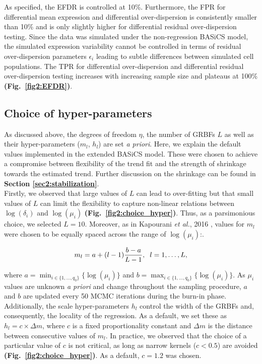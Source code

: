 As specified, the EFDR is controlled at 10\%. Furthermore, the FPR for differential mean expression and differential over-dispersion is consistently smaller than 10\% and is only slightly higher for differential residual over-dispersion testing. Since the data was simulated under the non-regression BASiCS model, the simulated expression variability cannot be controlled in terms of residual over-dispersion parameters $\epsilon_i$ leading to subtle differences between simulated cell populations. The TPR for differential over-dispersion and differential residual over-dispersion testing increases with increasing sample size and plateaus at 100\% \textbf{(Fig.~\ref{fig2:EFDR})}.

\subsection{Choice of hyper-parameters} \label{sec2:hyper-parameters}

As discussed above, the degrees of freedom $\eta$, the number of GRBFs  $L$ as well as their hyper-parameters ($m_l$, $h_l$) are set \emph{a priori}. Here, we explain the default values implemented in the extended BASiCS model. These were chosen to achieve a compromise between flexibility of the trend fit and the strength of shrinkage towards the estimated trend. Further discussion on the shrinkage can be found in \textbf{Section \ref{sec2:stabilization}}. \\ 

Firstly, we observed that large values of $L$ can lead to over-fitting but that small values of $L$ can limit the flexibility to capture non-linear relations between $\log(\delta_i)$ and $\log(\mu_i)$ \textbf{(Fig.~\ref{fig2:choice_hyper})}. Thus, as a parsimonious choice, we selected $L = 10$. Moreover, as in Kapourani \emph{et al.}, 2016 \cite{Kapourani2016}, values for $m_l$ were chosen to be equally spaced across the range of $\log(\mu_i)$:. 

\begin{equation} m_l = a + (l-1)\frac{b - a }{L-1}, \hspace{0.2cm}  l=1,\ldots, L, \end{equation} 

where $a=\min_{i\in\{1,\ldots,q_0\}}\{\log(\mu_i)\}$ and $b=\max_{i\in\{1,\ldots,q_0\}}\{\log(\mu_i)\}$. As $\mu_i$ values are unknown \emph{a priori} and change throughout the sampling procedure, $a$ and $b$ are updated every 50 MCMC iterations during the burn-in phase. Additionally, the scale hyper-parameters $h_l$ control the width of the GRBFs and, consequently, the locality of the regression. As a default, we set these as $h_l = c \times \Delta m$, where $c$ is a fixed proportionality constant and $\Delta m$ is the distance between consecutive values of $m_l$. In practice, we observed that the choice of a particular value of $c$ is not critical, as long as narrow kernels ($c<0.5$) are avoided \textbf{(Fig.~\ref{fig2:choice_hyper})}. As a default, $c = 1.2$ was chosen. 

